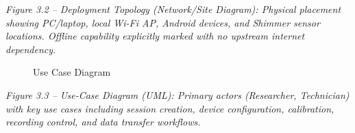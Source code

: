 \documentclass[12pt,a4paper]{article}
\begin{document}
\emph{Figure 3.2 -- Deployment Topology (Network/Site Diagram): Physical placement showing PC/laptop, local Wi-Fi AP, Android devices, and Shimmer sensor locations. Offline capability explicitly marked with no upstream internet dependency.}

\begin{figure}
\centering
{}
\caption{Use Case Diagram}
\end{figure}

\emph{Figure 3.3 -- Use-Case Diagram (UML): Primary actors (Researcher, Technician) with key use cases including session creation, device configuration, calibration, recording control, and data transfer workflows.}
\end{document}
